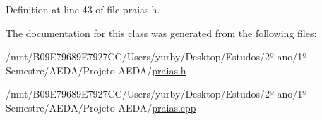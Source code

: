 Definition at line 43 of file praias.\+h.



The documentation for this class was generated from the following files\+:\begin{DoxyCompactItemize}
\item 
/mnt/\+B09\+E79689\+E7927\+C\+C/\+Users/yurby/\+Desktop/\+Estudos/2º ano/1º Semestre/\+A\+E\+D\+A/\+Projeto-\/\+A\+E\+D\+A/\hyperlink{praias_8h}{praias.\+h}\item 
/mnt/\+B09\+E79689\+E7927\+C\+C/\+Users/yurby/\+Desktop/\+Estudos/2º ano/1º Semestre/\+A\+E\+D\+A/\+Projeto-\/\+A\+E\+D\+A/\hyperlink{praias_8cpp}{praias.\+cpp}\end{DoxyCompactItemize}
